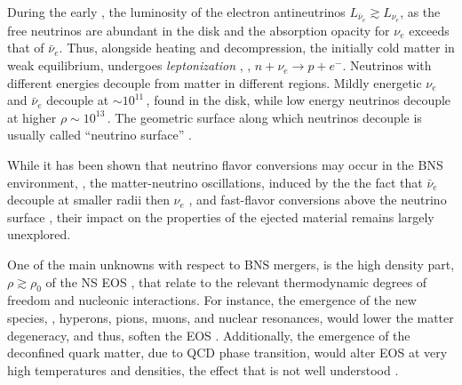 During the early \pmerg{}, the luminosity of the electron antineutrinos 
$L_{\bar{\nu}_e} \gtrsim L_{\nu_e}$, as the 
free neutrinos are abundant in the disk and the absorption opacity for $\nu_e$ 
exceeds that of $\bar{\nu}_e$.
Thus, alongside heating and decompression, the initially cold matter in weak 
equilibrium, undergoes \textit{leptonization} 
\citep{Perego:2014fma,Endrizzi:2019trv},
\ie, $n+\nu_e\rightarrow p + e^-$. 
%
Neutrinos with different energies decouple from matter in different regions.
Mildly energetic $\nu_{e}$ and $\bar{\nu}_e$ decouple at ${\sim}10^{11}\,$\gcm, found 
in the disk, while low energy neutrinos decouple at higher $\rho\sim10^{13}\,$\gcm.
The geometric surface along which neutrinos decouple is usually called ``neutrino 
surface'' \citep{Perego:2014fma,Endrizzi:2019trv}.

While it has been shown that neutrino flavor conversions may occur in the \ac{BNS} 
\pmerg{} environment, \eg, the matter-neutrino oscillations, induced by the 
the fact that $\bar{\nu}_e$ decouple at smaller radii then $\nu_{e}$ 
\citep[\eg][]{Zhu:2016mwa,Tian:2017xbr}, and fast-flavor conversions above the 
neutrino surface \citep{Wu:2017drk}, their impact on the properties of the ejected 
material remains largely unexplored.

One of the main unknowns with respect to \ac{BNS} mergers, is the high density part, 
$\rho \gtrsim \rho_0$ of the \ac{NS} \ac{EOS} \citep[\eg][]{Hebeler:2013nza,Oertel:2016bki}, that relate to the 
relevant thermodynamic degrees of freedom and nucleonic interactions. For instance, 
the emergence of the new species, \eg, hyperons, pions, muons, and nuclear 
resonances, would lower the matter degeneracy, and thus, soften the \ac{EOS} \citep[\eg][]{Fore:2019wib,Vidana:2010ip}.
Additionally, the emergence of the deconfined quark matter, due to \ac{QCD} phase transition,
would alter \ac{EOS} at very high temperatures and densities,
the effect that is not well understood \citep{Busza:2018rrf}.

